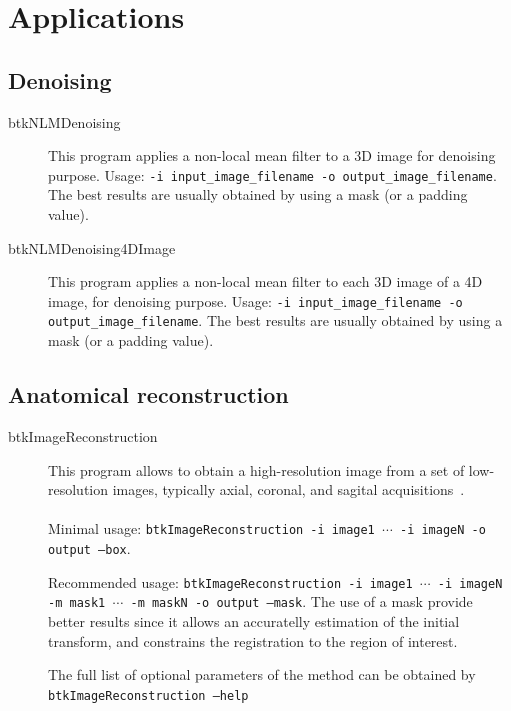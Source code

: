 \section{Applications}

\subsection{Denoising}

\begin{description}
 \item[btkNLMDenoising] This program applies a non-local mean filter to a 3D image for denoising purpose. Usage: \texttt{-i input\_image\_filename -o output\_image\_filename}. The best results are usually obtained by using a mask (or a padding value).
\end{description}

\begin{description}
 \item[btkNLMDenoising4DImage] This program applies a non-local mean filter to each 3D image of a 4D image, for denoising purpose. Usage: \texttt{-i input\_image\_filename -o output\_image\_filename}. The best results are usually obtained by using a mask (or a padding value).
\end{description}


\subsection{Anatomical reconstruction}

\begin{description}
 \item[btkImageReconstruction] This program allows to obtain a
high-resolution image from a set of low-resolution images, typically
axial, coronal, and sagital acquisitions~\cite{Rousseau2006}. \\\\
Minimal usage: \texttt{btkImageReconstruction -i image1 $\cdots$ -i imageN -o
output --box}. 

Recommended usage: \texttt{btkImageReconstruction -i image1 $\cdots$ -i imageN
-m mask1 $\cdots$ -m maskN -o output --mask}. The use of a mask provide
better results since it allows an accuratelly estimation of the initial
transform, and constrains the registration to the region of interest.

The full list of optional parameters of the method can be obtained by
\texttt{btkImageReconstruction --help}

\end{description}

